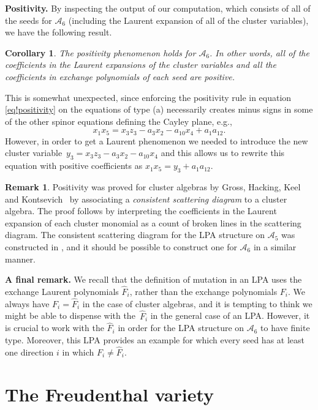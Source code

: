\documentclass[pdftex]{sigma}
\numberwithin{equation}{section}
\newtheorem{cor}[thm]{Corollary}
\theoremstyle{definition}
\newtheorem{rmk}[thm]{Remark}
\begin{document}
{\bf Positivity.}
By inspecting the output of our computation, which consists of all of the seeds for $\mathcal A_6$ (including the Laurent expansion of all of the cluster variables), we have the following result.

\begin{cor}\label{cor!positivity}
The positivity phenomenon holds for $\mathcal A_6$. In other words, all of the coefficients in the Laurent expansions of the cluster variables and all the coefficients in exchange polynomials of each seed are positive.
\end{cor}

This is somewhat unexpected, since enforcing the positivity rule in equation \eqref{eq!positivity} on the equations of type (a) necessarily creates minus signs in some of the other spinor equations defining the Cayley plane, e.g.,
\[ x_1x_5 = x_3z_3 - a_3x_2 - a_{10}x_4 + a_1a_{12}. \]
However, in order to get a Laurent phenomenon we needed to introduce the new cluster variable~${y_3=x_3z_3 - a_3x_2 - a_{10}x_4}$ and this allows us to rewrite this equation with positive coefficients as $x_1x_5 = y_3 + a_1a_{12}$.

\begin{rmk}
Positivity was proved for cluster algebras by Gross, Hacking, Keel and Kontsevich~\cite{ghkk} by associating a \emph{consistent scattering diagram} to a cluster algebra. The proof follows by interpreting the coefficients in the Laurent expansion of each cluster monomial as a count of broken lines in the scattering diagram. The consistent scattering diagram for the LPA structure on $\mathcal A_5$ was constructed in \cite{duc}, and it should be possible to construct one for $\mathcal A_6$ in a similar manner.
\end{rmk}

{\bf A final remark.}
We recall that the definition of mutation in an LPA uses the exchange Laurent polynomials $\widehat{F}_i$, rather than the exchange polynomials $F_i$. We always have $F_i=\widehat F_i$ in the case of cluster algebras, and it is tempting to think we might be able to dispense with the~$\widehat F_i$ in the general case of an LPA. However, it is crucial to work with the $\widehat F_i$ in order for the LPA structure on $\mathcal A_6$ to have finite type. Moreover, this LPA provides an example for which every seed has at least one direction $i$ in which $F_i\neq\widehat F_i$.

\section{The Freudenthal variety}
\end{document}
